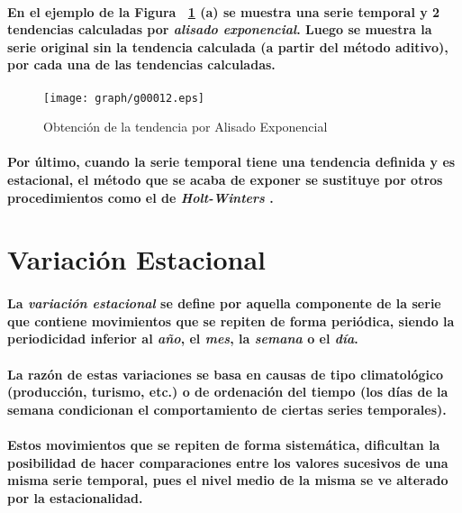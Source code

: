 \paragraph{
En el ejemplo de la Figura ~\ref{fig:TendenciaAlisadoExponencial} (a) se muestra una serie temporal y 2 tendencias calculadas por \emph{alisado exponencial}. Luego se muestra la serie original sin la tendencia calculada (a partir del método aditivo), por cada una de las tendencias calculadas.
}
\begin{figure}[ht]
\centering
\texttt{[image: graph/g00012.eps]}
\caption[Alisado Exponencial]{Obtención de la tendencia por Alisado Exponencial}
\label{fig:TendenciaAlisadoExponencial}
\end{figure}
\paragraph{
Por último, cuando la serie temporal tiene una tendencia definida y es estacional, el método que se acaba de exponer se sustituye por otros procedimientos como el de \emph{Holt-Winters} \cite{HOLTWINTERS,HOLTWINTERS01}.
}



\section{Variación Estacional}
\paragraph{
La \emph{variación estacional} se define por aquella componente de la serie que contiene movimientos que se repiten de forma periódica, siendo la periodicidad inferior al \emph{año}, el \emph{mes}, la \emph{semana} o el \emph{día}.
}
\paragraph{
La razón de estas variaciones se basa en causas de tipo climatológico (producción, turismo, etc.) o de ordenación del tiempo (los días de la semana condicionan el comportamiento de ciertas series temporales).
}
\paragraph{
Estos movimientos que se repiten de forma sistemática, dificultan la posibilidad de hacer comparaciones entre los valores sucesivos de una misma serie temporal, pues el nivel medio de la misma se ve alterado por la estacionalidad.
}
